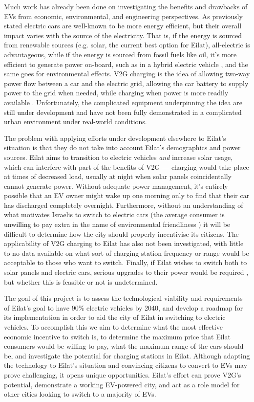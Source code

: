 \documentclass{article}                         %
\begin{document}
Much work has already been done on investigating the benefits and drawbacks of EVs from economic, environmental, and engineering perspectives. As previously stated electric cars are well-known to be more energy efficient, but their overall impact varies with the source of the electricity. That is, if the energy is sourced from renewable sources (e.g. solar, the current best option for Eilat), all-electric is advantageous, while if the energy is sourced from fossil fuels like oil, it's more efficient to generate power on-board, such as in a hybrid electric vehicle \cite{Dincer2010EconomicOptions}, and the same goes for environmental effects. V2G charging is the idea of allowing two-way power flow between a car and the electric grid, allowing the car battery to supply power to the grid when needed, while charging when power is more readily available \cite{Mahmud2015PowerEV}. Unfortunately, the complicated equipment underpinning the idea are still under development \cite{2018Nuvve...} and have not been fully demonstrated in a complicated urban environment under real-world conditions.

The problem with applying efforts under development elsewhere to Eilat's situation is that they do not take into account Eilat's demographics and power sources. Eilat aims to transition to electric vehicles \textit{and} increase solar usage, which can interfere with part of the benefits of V2G --- charging would take place at times of decreased load, usually at night when solar panels coincidentally cannot generate power. Without adequate power management, it's entirely possible that an EV owner might wake up one morning only to find that their car has discharged completely overnight. Furthermore, without an understanding of what motivates Israelis to switch to electric cars (the average consumer is unwilling to pay extra in the name of environmental friendliness \cite{Mock2010MarketVehicles}) it will be difficult to determine how the city should properly incentivise its citizens. The applicability of V2G charging to Eilat has also not been investigated, with little to no data available on what sort of charging station frequency or range would be acceptable to those who want to switch. Finally, if Eilat wishes to switch both to solar panels and electric cars, serious upgrades to their power would be required \cite{Vardimon2011AssessmentIsrael}, but whether this is feasible or not is undetermined.

The goal of this project is to assess the technological viability and requirements of Eilat's goal to have 90\% electric vehicles by 2040, and develop a roadmap for its implementation in order to aid the city of Eilat in switching to electric vehicles. To accomplish this we aim to determine what the most effective economic incentive to switch is, to determine the maximum price that Eilat consumers would be willing to pay, what the maximum range of the cars should be, and investigate the potential for charging stations in Eilat. Although adapting the technology to Eilat's situation and convincing citizens to convert to EVs may prove challenging, it opens unique opportunities. Eilat's effort can prove V2G's potential, demonstrate a working EV-powered city, and act as a role model for other cities looking to switch to a majority of EVs.
\end{document}
